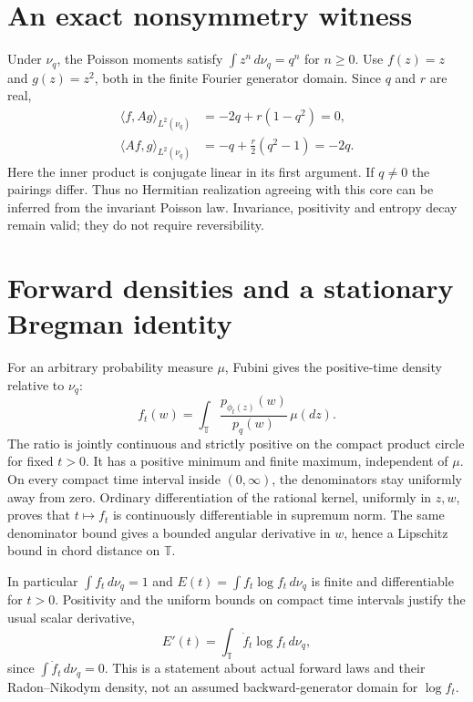 \documentclass[11pt]{article}
\newcommand{\T}{\mathbb T}\newcommand{\D}{\mathbb D}
\begin{document}
\section{An exact nonsymmetry witness}
Under $\nu_q$, the Poisson moments satisfy
$\int z^n\,d\nu_q=q^n$ for $n\geq0$.
Use $f(z)=z$ and $g(z)=z^2$, both in the finite
Fourier generator domain. Since $q$ and $r$ are real,
\begin{align*}
 \langle f,Ag\rangle_{L^2(\nu_q)}
 &=-2q+r(1-q^2)=0,\\
 \langle Af,g\rangle_{L^2(\nu_q)}
 &=-q+\tfrac r2(q^2-1)=-2q.
\end{align*}
Here the inner product is conjugate linear in its first
argument. If $q\ne0$ the pairings differ. Thus no
Hermitian realization agreeing with this core can be
inferred from the invariant Poisson law.
Invariance, positivity and entropy decay remain valid;
they do not require reversibility.

\section{Forward densities and a stationary Bregman identity}
For an arbitrary probability measure $\mu$, Fubini gives
the positive-time density relative to $\nu_q$:
\begin{equation}\label{eq:density}
 f_t(w)=\int_\T
       \frac{p_{\phi_t(z)}(w)}{p_q(w)}\,\mu(dz).
\end{equation}
The ratio is jointly continuous and strictly positive
on the compact product circle for fixed $t>0$. It has
a positive minimum and finite maximum, independent of
$\mu$. On every compact time interval inside $(0,\infty)$,
the denominators stay uniformly away from zero. Ordinary
differentiation of the rational kernel, uniformly in
$z,w$, proves that $t\mapsto f_t$ is continuously
differentiable in supremum norm. The same denominator
bound gives a bounded angular derivative in $w$, hence
a Lipschitz bound in chord distance on $\T$.

In particular $\int f_t\,d\nu_q=1$ and
$E(t)=\int f_t\log f_t\,d\nu_q$ is finite and differentiable
for $t>0$. Positivity and the uniform bounds on compact
time intervals justify the usual scalar derivative,
\begin{equation}\label{eq:ordinaryentropy}
 E'(t)=\int_\T \dot f_t\log f_t\,d\nu_q,
\end{equation}
since $\int\dot f_t\,d\nu_q=0$.
This is a statement about actual forward laws and their
Radon--Nikodym density, not an assumed backward-generator
domain for $\log f_t$.
\end{document}
